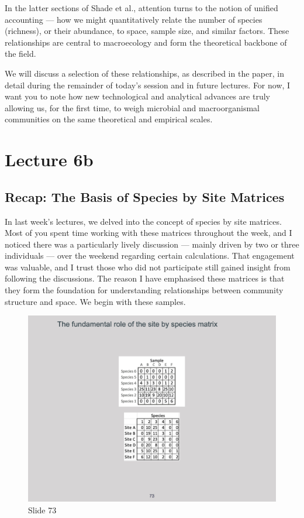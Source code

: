 \documentclass[
  10pt,
]{book}
\begin{document}
In the latter sections of Shade et al., attention turns to the notion of
unified accounting --- how we might quantitatively relate the number of
species (richness), or their abundance, to space, sample size, and
similar factors. These relationships are central to macroecology and
form the theoretical backbone of the field.

We will discuss a selection of these relationships, as described in the
paper, in detail during the remainder of today's session and in future
lectures. For now, I want you to note how new technological and
analytical advances are truly allowing us, for the first time, to weigh
microbial and macroorganismal communities on the same theoretical and
empirical scales.

\chapter*{Lecture 6b}\label{lecture-6b}

\section{Recap: The Basis of Species by Site
Matrices}\label{recap-the-basis-of-species-by-site-matrices}

In last week's lectures, we delved into the concept of species by site
matrices. Most of you spent time working with these matrices throughout
the week, and I noticed there was a particularly lively discussion ---
mainly driven by two or three individuals --- over the weekend regarding
certain calculations. That engagement was valuable, and I trust those
who did not participate still gained insight from following the
discussions. The reason I have emphasised these matrices is that they
form the foundation for understanding relationships between community
structure and space. We begin with these samples.

\begin{figure}[ht]
\centering
\includegraphics[width=0.8\linewidth]{../images/BDC334/BDC334-073.jpeg}
\caption*{Slide 73}
\end{figure}
\end{document}
